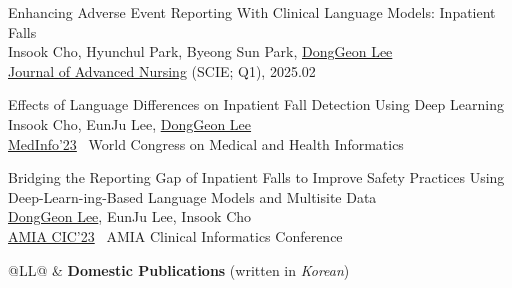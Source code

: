 \documentclass[11pt,a4paper]{article}
\newlength{\leftcolumn}
\newlength{\rightcolumn}
\newlength{\midrightcolumn}
\newcounter{pubnum}
\newenvironment{publications}
{\begin{list}{}
    {\setlength{\leftmargin}{1.35in}
     \setlength{\itemsep}{0.5em}
     \setlength{\labelsep}{0em}
     \renewcommand{\makelabel}[1]{##1}}}
{\end{list}}
\newcommand{\pubitem}[1]{%
    \addtocounter{pubnum}{-1}%
    \item[\textup{[\arabic{pubnum}]}] #1%
}
\begin{document}
\begin{publications}

\pubitem{
    Enhancing Adverse Event Reporting With Clinical Language Models: Inpatient Falls\\
        Insook Cho, Hyunchul Park, Byeong Sun Park, \underline{DongGeon Lee} \\[3pt]
        \href{https://doi.org/10.1111/jan.16812}{Journal of Advanced Nursing} (SCIE; Q1), 2025.02
}

\pubitem{
    Effects of Language Differences on Inpatient Fall Detection Using Deep Learning \\
        Insook Cho, EunJu Lee, \underline{DongGeon Lee}\\[3pt]
        \href{https://pubmed.ncbi.nlm.nih.gov/38426881/}{MedInfo'23} \textbar\ World Congress on Medical and Health Informatics
}

\pubitem{
    Bridging the Reporting Gap of Inpatient Falls to Improve Safety Practices Using Deep-Learn-ing-Based Language Models and Multisite Data \\
        \underline{DongGeon Lee}, EunJu Lee, Insook Cho\\[3pt]
        \href{https://s4.goeshow.com/amia/cic/2023/schedule_at_a_glance.cfm?session_key=00DF797E-CE00-F26D-04E7-70E1ABCC96E1\&session_date=Thursday,\%20May\%2025,\%202023}{AMIA CIC'23} \textbar\ AMIA Clinical Informatics Conference
}

\end{publications}
\vspace{0.5em}

\begin{tabular}{@{}L{\leftcolumn}L{\midrightcolumn}@{}}
\textcolor{sectioncolor}{} & \textbf{Domestic Publications} (written in \textit{Korean})
\end{tabular}
\vspace{-0.5em}
\end{document}
